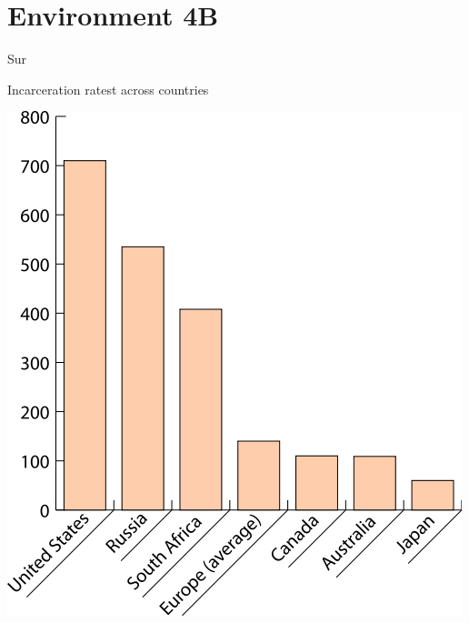
\section{Environment 4B}

\begin{map}{S}{ur}
\caption{Incarceration ratest across countries}
\label{chart:incarceration}
\includegraphics[width=\chartwidth,height=\chartheight]{incarceration}  
\end{map}


